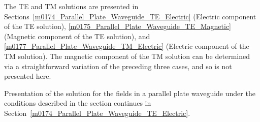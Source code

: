 The TE and TM solutions are presented in Sections~\ref{m0174_Parallel_Plate_Waveguide_TE_Electric} (Electric component of the TE solution),
\ref{m0175_Parallel_Plate_Waveguide_TE_Magnetic} (Magnetic component of the TE solution), and
\ref{m0177_Parallel_Plate_Waveguide_TM_Electric} (Electric component of the TM solution).
The magnetic component of the TM solution can be determined via a straightforward variation of the preceding three cases, and so is not presented here.

Presentation of the solution for the fields in a parallel plate waveguide under the conditions described in the section continues in Section~\ref{m0174_Parallel_Plate_Waveguide_TE_Electric}. 



